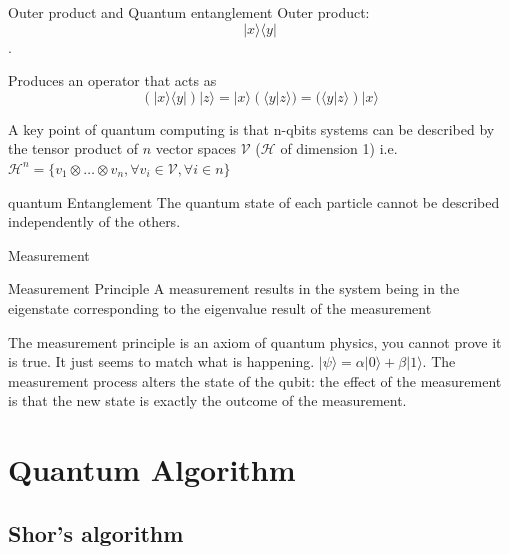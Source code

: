 \documentclass[svgnames,smaller,aspectratio=169]{beamer}
\begin{document}
\begin{frame}[fragile]{Outer product and Quantum entanglement}
  Outer product:$$|x\rangle \langle y |$$.
  
  Produces an operator that acts as $$(|x\rangle \langle y|)|z\rangle = |x\rangle(\langle y|z\rangle) = (\langle
  y|z\rangle)|x\rangle$$

  
  A key point of quantum computing is that n-qbits systems can be described by the tensor product of $n$ vector
  spaces $\mathcal{V}$ ($\mathcal{H}$ of dimension 1) i.e. $\mathcal{H}^n = \{ v_1 \otimes \ldots \otimes v_n, \forall v_i \in \mathcal{V}, \forall i \in n \}$

  \begin{block}{quantum Entanglement}
    The quantum state of each particle cannot be described independently of the others.
  \end{block}
\end{frame}

\begin{frame}[fragile]{Measurement}
  \begin{block}{Measurement Principle}
    A measurement results in the system being in the eigenstate corresponding to the eigenvalue result of the measurement
  \end{block}
  The measurement principle is an axiom of quantum physics, you cannot prove it is true. It just seems to match what is
  happening.  $|\psi\rangle = \alpha |0\rangle + \beta |1\rangle$. The measurement process alters the state of the qubit: the effect
  of the measurement is that the new state is exactly the outcome of the measurement.
\end{frame}



\section{Quantum Algorithm}

\subsection{Shor's algorithm}
\end{document}
